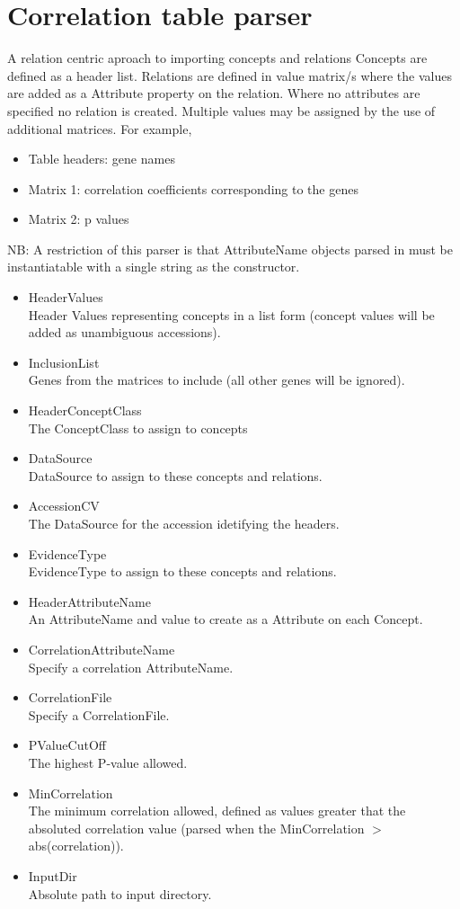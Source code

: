 \section{Correlation table parser}
A relation centric aproach to importing concepts and relations Concepts are defined as a header list. 
Relations are defined in value matrix/s where the values are added as a Attribute property on the relation. 
Where no attributes are specified no relation is created. Multiple values may be assigned by the use of additional matrices.
For example, 
\begin{itemize}
  \item Table headers: gene names
  \item Matrix 1: correlation coefficients corresponding to the genes
  \item Matrix 2: p values 
\end{itemize}
NB: A restriction of this parser is that AttributeName objects
parsed in must be instantiatable with a single string as the constructor.
\begin{itemize}
  \item{HeaderValues}\\
  Header Values representing concepts in a list form (concept values will be added as unambiguous accessions).
  \item{InclusionList}\\
  Genes from the matrices to include (all other genes will be ignored).
  \item{HeaderConceptClass}\\
  The ConceptClass to assign to concepts
  \item{DataSource}\\
  DataSource to assign to these concepts and relations.
  \item{AccessionCV}\\
  The DataSource for the accession idetifying the headers.
  \item{EvidenceType}\\
  EvidenceType to assign to these concepts and relations.
  \item{HeaderAttributeName}\\
  An AttributeName and value to create as a Attribute on each Concept.
  \item{CorrelationAttributeName}\\
  Specify a correlation AttributeName.
  \item{CorrelationFile}\\
  Specify a CorrelationFile.
  \item{PValueCutOff}\\
  The highest P-value allowed.
  \item{MinCorrelation}\\
  The minimum correlation allowed, defined as values greater that the absoluted correlation value (parsed when the MinCorrelation $>$ abs(correlation)).
  \item{InputDir}\\
  Absolute path to input directory.
\end{itemize}
    
